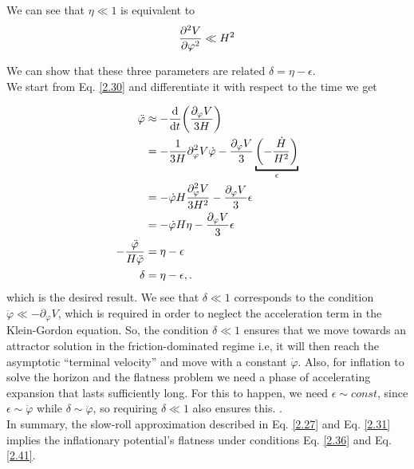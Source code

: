 We can see that \(\eta \ll 1 \) is equivalent to
\begin{align}
    \pdv[2]{V}{\varphi} \ll H^2 \label{2.42}
\end{align}

We can show that these three parameters are related  \(\delta = \eta - \epsilon \).\\
We start from Eq. \ref{2.30} and differentiate it with respect to the time we get 

\begin{align}
    \ddot{\varphi} &\approx - \dv{}{t} \qty( \frac{\partial_{\varphi} V}{3H})  \\ &= - \frac{1}{3H} \partial^{2} _{\varphi} V \dot{\varphi} - \frac{\partial_{\varphi} V}{3} \underbracket{\qty(- \frac{\dot{H}}{H^2})}_{\epsilon }  \\ &= - \dot{\varphi} H \frac{\partial^{2} _{\varphi} V}{3H^2} - \frac{\partial_{\varphi} V}{3} \epsilon  \\ &= - \dot{\varphi} H \eta - \frac{\partial_{\varphi} V}{3} \epsilon  \\ {-\frac{\ddot{\varphi}}{H \ddot{\varphi}}} &= \eta - \epsilon  \\
    \delta &= \eta - \epsilon,.\label{2.48}
\end{align}
which is the desired result.
We see that $\delta \ll 1 $ corresponds to the condition $\ddot{\varphi} \ll -\partial_{\varphi} V$, which is required in order to neglect the acceleration term in the Klein-Gordon equation. So, the condition  $\delta \ll 1 $ ensures that we move towards an attractor solution in the friction-dominated regime i.e, it will then reach the asymptotic “terminal velocity” and move with a constant $\dot{\varphi}$. Also, for inflation to solve the horizon and the flatness problem  we need a phase of accelerating expansion that lasts sufficiently long. For this to happen, we need $\epsilon \sim const$, since $\epsilon \sim \dot{\varphi}$ while $\delta \sim \ddot{\varphi}$, so requiring $\delta \ll 1$ also ensures this.
.\\
\hspace{0.5cm}In summary, the slow-roll approximation described in Eq. \ref{2.27} and Eq. \ref{2.31} implies the inflationary potential's flatness under conditions Eq. \ref{2.36} and Eq. \ref{2.41}.\\



